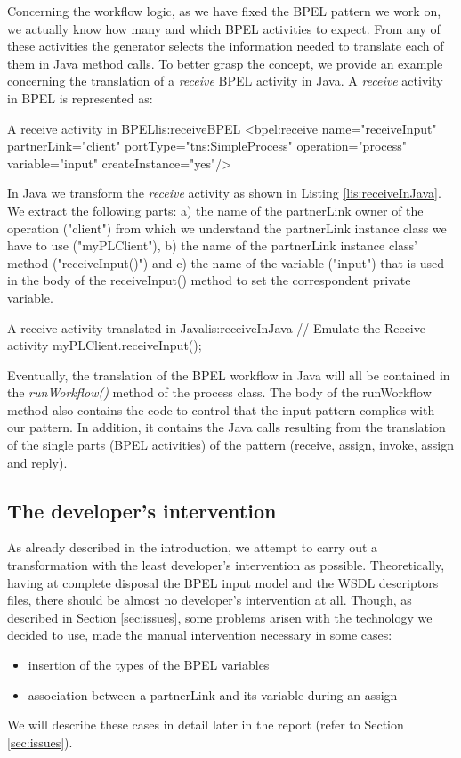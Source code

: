 Concerning the workflow logic, as we have fixed the BPEL pattern we work on, we actually know how many and which BPEL activities to expect. From any of these activities the generator selects the information needed to translate each of them in Java method calls. To better grasp the concept, we provide an example concerning the translation of a \textit{receive} BPEL activity in Java.
A \textit{receive} activity in BPEL is represented as:

\begin{workflow-code}{A receive activity in BPEL}{lis:receiveBPEL}
<bpel:receive name="receiveInput" partnerLink="client"
                 portType="tns:SimpleProcess"
                 operation="process" variable="input"
                 createInstance="yes"/>
\end{workflow-code}

In Java we transform the \textit{receive} activity as shown in Listing \ref{lis:receiveInJava}. We extract the following parts: a) the name of the partnerLink owner of the operation ("client") from which we understand the partnerLink instance class we have to use ("myPLClient"), b) the name of the partnerLink instance class' method ("receiveInput()") and c) the name of the variable ("input") that is used in the body of the receiveInput() method to set the correspondent private variable. 

\begin{java-code}{A receive activity translated in Java}{lis:receiveInJava}
// Emulate the Receive activity		
		myPLClient.receiveInput();	
\end{java-code}

Eventually, the translation of the BPEL workflow in Java will all be contained in the \textit{runWorkflow()} method of the process class. The body of the runWorkflow method also contains the code to control that the input pattern complies with our pattern. In addition, it contains the Java calls resulting from the translation of the single parts (BPEL activities) of the pattern (receive, assign, invoke, assign and reply).

\subsection{The developer's intervention}
\label{sec:developerIntervention}
As already described in the introduction, we attempt to carry out a transformation with the least developer's intervention as possible.
Theoretically, having at complete disposal the BPEL input model and the WSDL descriptors files, there should be almost no developer's intervention at all. Though, as described in Section \ref{sec:issues}, some problems arisen with the technology we decided to use, made the manual intervention necessary in some cases:
\begin{itemize}
 \item insertion of the types of the BPEL variables
 \item association between a partnerLink and its variable during an assign
\end{itemize}
We will describe these cases in detail later in the report (refer to Section \ref{sec:issues}).

